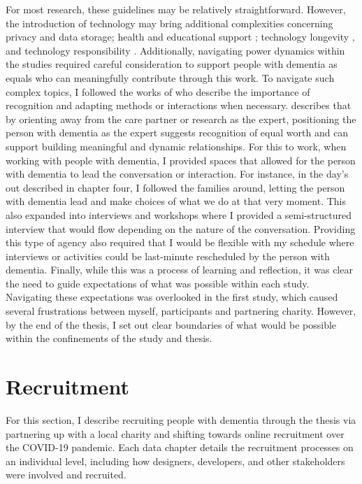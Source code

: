 For most research, these guidelines may be relatively straightforward. However, the introduction of technology may bring additional complexities concerning privacy and data storage; health and educational support \citep{gray2016inscribing}; technology longevity \citep{foley_printer_2019}, and technology responsibility \citep{ferrario_software_2014}. Additionally, navigating power dynamics within the studies required careful consideration to support people with dementia as equals who can meaningfully contribute through this work. To navigate such complex topics, I followed the works of \cite{nolan_beyond_2004,bartlett_personhood_2007,keady_involving_2007} who describe the importance of recognition and adapting methods or interactions when necessary. \cite{nolan2002towards} describes that by orienting away from the care partner or research as the expert, positioning the person with dementia as the expert suggests recognition of equal worth and can support building meaningful and dynamic relationships. For this to work, when working with people with dementia, I provided spaces that allowed for the person with dementia to lead the conversation or interaction. For instance, in the day's out described in chapter four, I followed the families around, letting the person with dementia lead and make choices of what we do at that very moment. This also expanded into interviews and workshops where I provided a semi-structured interview that would flow depending on the nature of the conversation. Providing this type of agency also required that I would be flexible with my schedule where interviews or activities could be last-minute rescheduled by the person with dementia. Finally, while this was a process of learning and reflection, it was clear the need to guide expectations of what was possible within each study. Navigating these expectations was overlooked in the first study, which caused several frustrations between myself, participants and partnering charity. However, by the end of the thesis, I set out clear boundaries of what would be possible within the confinements of the study and thesis.

\section{Recruitment}
\label{Method:Recruitment}
For this section, I describe recruiting people with dementia through the thesis via partnering up with a local charity and shifting towards online recruitment over the COVID-19 pandemic. Each data chapter details the recruitment processes on an individual level, including how designers, developers, and other stakeholders were involved and recruited.


